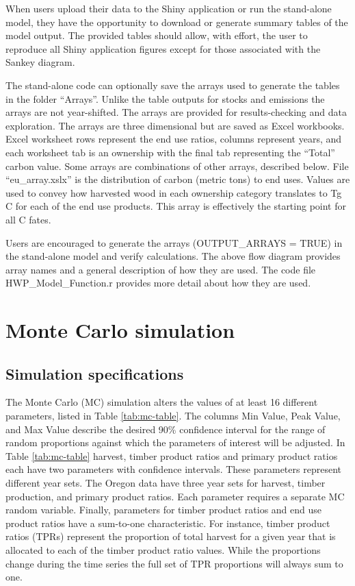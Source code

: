 \documentclass[
  openany]{book}
\begin{document}
When users upload their data to the Shiny application or run the stand-alone model, they have the opportunity to download or generate summary tables of the model output. The provided tables should allow, with effort, the user to reproduce all Shiny application figures except for those associated with the Sankey diagram.

The stand-alone code can optionally save the arrays used to generate the tables in the folder ``Arrays''. Unlike the table outputs for stocks and emissions the arrays are not year-shifted. The arrays are provided for results-checking and data exploration. The arrays are three dimensional but are saved as Excel workbooks. Excel worksheet rows represent the end use ratios, columns represent years, and each worksheet tab is an ownership with the final tab representing the ``Total'' carbon value. Some arrays are combinations of other arrays, described below. File ``eu\_array.xslx'' is the distribution of carbon (metric tons) to end uses. Values are used to convey how harvested wood in each ownership category translates to Tg C for each of the end use products. This array is effectively the starting point for all C fates.

Users are encouraged to generate the arrays (OUTPUT\_ARRAYS = TRUE) in the stand-alone model and verify calculations. The above flow diagram provides array names and a general description of how they are used. The code file HWP\_Model\_Function.r provides more detail about how they are used.

\hypertarget{model-mc}{%
\section{Monte Carlo simulation}\label{model-mc}}

\hypertarget{model-mc-spec}{%
\subsection{Simulation specifications}\label{model-mc-spec}}

The Monte Carlo (MC) simulation alters the values of at least 16 different parameters, listed in Table \ref{tab:mc-table}. The columns Min Value, Peak Value, and Max Value describe the desired 90\% confidence interval for the range of random proportions against which the parameters of interest will be adjusted. In Table \ref{tab:mc-table} harvest, timber product ratios and primary product ratios each have two parameters with confidence intervals. These parameters represent different year sets. The Oregon data have three year sets for harvest, timber production, and primary product ratios. Each parameter requires a separate MC random variable. Finally, parameters for timber product ratios and end use product ratios have a sum-to-one characteristic. For instance, timber product ratios (TPRs) represent the proportion of total harvest for a given year that is allocated to each of the timber product ratio values. While the proportions change during the time series the full set of TPR proportions will always sum to one.
\end{document}
